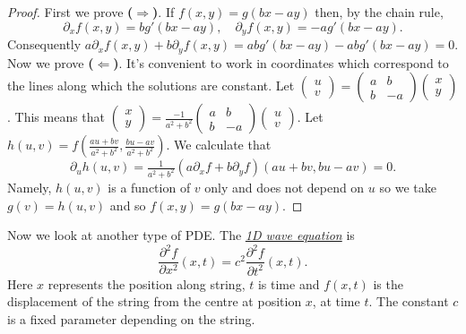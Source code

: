 \begin{proof}
    First we prove \textbf{(\(\boldsymbol\Rightarrow\))}.
    If \(f(x,y)= g(bx-ay)\) then, by the chain rule,
    \[
        \partial_x f(x,y) = bg'(bx-ay),
        \quad
        \partial_y f(x,y) = -ag'(bx-ay).
    \]
    Consequently \(a\partial_x f(x,y) + b \partial_y f(x,y) = a bg'(bx-ay) - abg'(bx-ay) = 0\).
    Now we prove \textbf{(\(\boldsymbol\Leftarrow\))}.
    It's convenient to work in coordinates which correspond to the lines along which the solutions are constant.
    Let \(\left(\begin{smallmatrix}
            u\\ v
        \end{smallmatrix}\right)
    = \left(\begin{smallmatrix}
            a & b \\ b & -a
        \end{smallmatrix}\right)
    \left(\begin{smallmatrix}
            x \\ y
        \end{smallmatrix}\right)\).
    This means that
    \(\left(\begin{smallmatrix}
            x\\ y
        \end{smallmatrix}\right)
    = \frac{-1}{a^2 + b^2} \left(\begin{smallmatrix}
            a & b \\ b & -a
        \end{smallmatrix}\right)
    \left(\begin{smallmatrix}
            u \\ v
        \end{smallmatrix}\right)\).
    Let \(h(u,v)=f(\frac{au + bv}{a^2 + b^2}, \frac{bu-av}{a^2+b^2})\).
    We calculate that
    \[
        \partial_u h(u,v)
        = \tfrac{1}{{a^2 + b^2}}
        \left( a \partial_x f
        + b \partial_y f \right)  (au + bv, bu-av) = 0.
    \]
    Namely, \(h(u,v)\) is a function of \(v\) only and does not depend on \(u\) so we take \(g(v) = h(u,v)\) and so \(f(x,y) = g(bx-ay)\).
\end{proof}

Now we look at another type of PDE.\@
The \href{https://en.wikipedia.org/wiki/Wave_equation}{\emph{1D wave equation}} is
\[
    \frac{\partial^2 f}{\partial x^2}(x,t) = c^2  \frac{\partial^2 f}{\partial t^2}(x,t).
\]
Here \(x\) represents the position along string,
\(t\) is time and \(f(x,t)\) is the displacement of the string from the centre at position \(x\), at time \(t\).
The constant \(c\) is a fixed parameter depending on the string.

